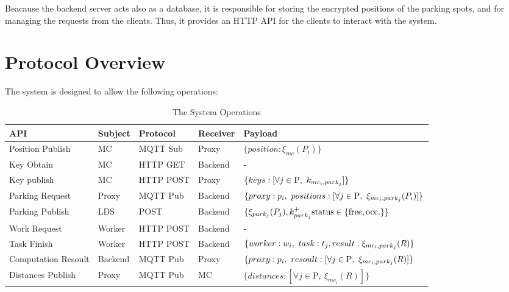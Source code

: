 \documentclass[12pt,a4paper,twoside]{book}
\begin{document}
Beacause the backend server acts also as a database, it is responsible for storing the encrypted positions of the parking spots, and for managing the requests from the clients. Thus, it provides an HTTP API for the clients to interact with the system. 


\section{Protocol Overview}
The system is designed to allow the following operations:

\begin{table}[h]
\renewcommand{\arraystretch}{1.3}
\small
\begin{tabularx}{\linewidth}{|l|X|X|X|p{4cm}|}
\hline
\textbf{API} & \textbf{Subject} & \textbf{Protocol} & \textbf{Receiver} & \textbf{Payload} \\ \hline
Position Publish & MC & MQTT Sub & Proxy & $\{position: \xi_{mc}( P_i )\}$ \\ \hline
Key Obtain & MC & HTTP GET & Backend & - \\ \hline
Key publish & MC & HTTP POST & Proxy & $\{keys: \newline [\forall j \in \text{P},\ k_{mc_i, park_j}]\}$ \\ \hline
Parking Request & Proxy & MQTT Pub & Backend &
$\{proxy: p_i,\ positions: \newline [\forall j \in \text{P},\ \xi_{mc_i, park_j}(P_i)]\}$ \\ \hline
Parking Publish & LDS & POST & Backend & $\{\xi_{park_j}(P_j), k_{park_j}^+\newline \text{status} \in \{\text{free}, \text{occ.}\}\}$ \\ \hline
Work Request & Worker & HTTP POST & Backend & - \\ \hline
Task Finish & Worker & HTTP POST & Backend & $\{worker: w_i,\ task: t_j,\newline result: \xi_{mc_i, park_j}(R)\}$ \\ \hline
Computation Resoult & Backend & MQTT Pub & Proxy & $\{proxy: p_i,\ resoult: \newline [\forall j \in \text{P},\ \xi_{mc_i, park_j}(R)]\}$ \\ \hline
Distances Publish & Proxy & MQTT Pub & MC & $\{distances: [\forall j \in \text{P},\ \xi_{mc_i}(R)]\}$ \\ \hline
\end{tabularx}
\caption{The System Operations}
\label{table:system-operations}
\end{table}
\end{document}
